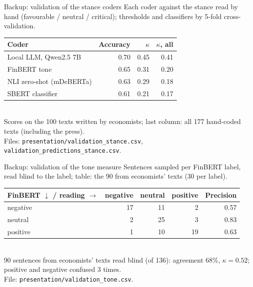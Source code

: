 \documentclass[aspectratio=169,10pt]{beamer}
\begin{document}
\begin{frame}{Backup: validation of the stance coders}
\footnotesize
Each coder against the stance read by hand (favourable / neutral / critical); thresholds and classifiers by 5-fold cross-validation.\\[4pt]
\begin{tabular}{@{}lrrr@{}}\toprule
\textbf{Coder} & \textbf{Accuracy} & $\kappa$ & $\kappa$\textbf{, all}\\\midrule
\rowcolor{c4!12}Local LLM, Qwen2.5 7B & 0.70 & 0.45 & 0.41 \\
FinBERT tone & 0.65 & 0.31 & 0.20 \\
NLI zero-shot (mDeBERTa) & 0.63 & 0.29 & 0.18 \\
SBERT classifier & 0.61 & 0.21 & 0.17 \\
\bottomrule\end{tabular}\\[4pt]
Scores on the 100 texts written by economists; last column: all 177 hand-coded texts (including the press).\\[3pt]
\scriptsize Files: \texttt{presentation/validation\_stance.csv}, \texttt{validation\_predictions\_stance.csv}.
\end{frame}

\begin{frame}{Backup: validation of the tone measure}
\footnotesize
Sentences sampled per FinBERT label, read blind to the label; table: the 90 from economists' texts (30 per label).\\[4pt]
\begin{tabular}{@{}lrrrr@{}}\toprule
\textbf{FinBERT $\downarrow$ / reading $\rightarrow$} & \textbf{negative} & \textbf{neutral} & \textbf{positive} & \textbf{Precision}\\\midrule
negative & 17 & 11 & 2 & 0.57 \\
neutral & 2 & 25 & 3 & 0.83 \\
positive & 1 & 10 & 19 & 0.63 \\
\bottomrule\end{tabular}\\[4pt]
90 sentences from economists' texts read blind (of 136): agreement 68\%, $\kappa = 0.52$; positive and negative confused 3 times.\\[3pt]
\scriptsize File: \texttt{presentation/validation\_tone.csv}.
\end{frame}
\end{document}
